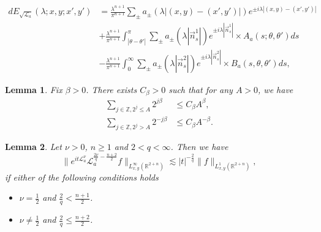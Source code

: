 \documentclass[10pt,a4paper]{amsart}
\newtheorem{lemma}{Lemma}
\begin{document}
\begin{equation}\label{spectral}
\begin{aligned}
dE_{\sqrt{\mathcal{L}_a}}(\lambda; x, y; x', y') &= \frac{\lambda^{n+1}}{\pi^{n+1}} \sum_{\pm} a_{\pm}(\lambda|(x, y) - (x', y')|) e^{\pm i\lambda|(x, y) - (x', y')|}  \\
 &+ \frac{\lambda^{n+1}}{\pi^{n+1}} \int_{|\theta - \theta'|}^{\pi} \sum_{\pm} a_{\pm}(\lambda|\vec{n}_s^1|) e^{\pm i\lambda|\vec{n}_s^1|} \times A_a(s; \theta, \theta') ds  \\
&- \frac{\lambda^{n+1}}{\pi^{n+1}} \int_0^\infty \sum_{\pm} a_{\pm}(\lambda|\vec{n}_s^2|) e^{\pm i\lambda|\vec{n}_s^2|} \times B_a(s, \theta, \theta') ds, 
\end{aligned}
\end{equation}

\begin{lemma}\label{Sum}
Fix $\beta>0$. There exists $C_\beta>0$ such that for any $A>0$, we have
\begin{align*}
\sum_{j\in\mathbb{Z}, 2^j\leq A}2^{j\beta}&\leq C_\beta A^\beta,\\
\sum_{j\in\mathbb{Z}, 2^j>A}2^{-j\beta}&\leq C_\beta A^{-\beta}.
\end{align*}
\end{lemma}

\begin{lemma}\label{key lemma}
Let $\nu>0$, $n\geq 1$ and $2<q<\infty$. Then we have
\begin{equation}
\|e^{it\mathcal{L}_a^\nu} \mathcal{L}_a^{\frac{2\nu}{q}-\frac{n+2}{2}}f\|_{L_{x,y}^\infty(\mathbb{R}^{2+n})}\lesssim |t|^{-\frac{2}{q}}\|f\|_{L_{x,y}^1(\mathbb{R}^{2+n})},
\end{equation}
if either of the following conditions holds
\begin{itemize}
\item $\nu=\frac{1}{2}$ and $\frac{2}{q}<\frac{n+1}{2}$.
\item $\nu\not=\frac{1}{2}$ and $\frac{2}{q}\leq\frac{n+2}{2}$.
\end{itemize}
\end{lemma}
\end{document}
